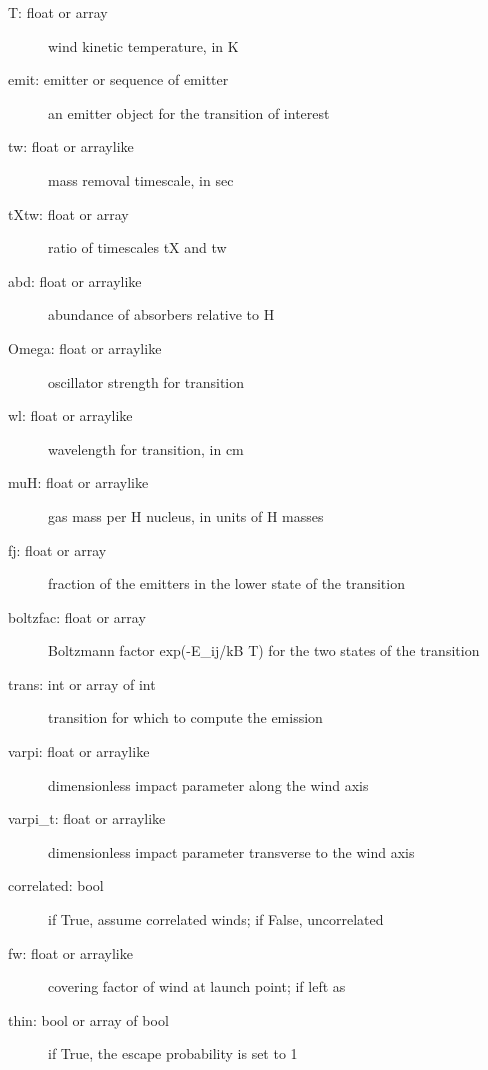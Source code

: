 \documentclass[letterpaper,10pt,english]{sphinxmanual}
\begin{document}
\begin{fulllineitems}
\begin{fulllineitems}
\begin{description}
\begin{description}
\item[{T: float or array}] \leavevmode
wind kinetic temperature, in K

\item[{emit: emitter or sequence of emitter}] \leavevmode
an emitter object for the transition of interest

\item[{tw: float or arraylike}] \leavevmode
mass removal timescale, in sec

\item[{tXtw: float or array}] \leavevmode
ratio of timescales tX and tw

\item[{abd: float or arraylike}] \leavevmode
abundance of absorbers relative to H

\item[{Omega: float or arraylike}] \leavevmode
oscillator strength for transition

\item[{wl: float or arraylike}] \leavevmode
wavelength for transition, in cm

\item[{muH: float or arraylike}] \leavevmode
gas mass per H nucleus, in units of H masses

\item[{fj: float or array}] \leavevmode
fraction of the emitters in the lower state of the
transition

\item[{boltzfac: float or array}] \leavevmode
Boltzmann factor exp(-E\_ij/kB T) for the two states of
the transition

\item[{trans: int or array of int}] \leavevmode
transition for which to compute the emission

\item[{varpi: float or arraylike}] \leavevmode
dimensionless impact parameter along the wind axis

\item[{varpi\_t: float or arraylike}] \leavevmode
dimensionless impact parameter transverse to the wind axis

\item[{correlated: bool}] \leavevmode
if True, assume correlated winds; if False, uncorrelated

\item[{fw: float or arraylike}] \leavevmode
covering factor of wind at launch point; if left as

\item[{thin: bool or array of bool}] \leavevmode
if True, the escape probability is set to 1


\end{description}
\end{description}
\end{fulllineitems}
\end{fulllineitems}
\end{document}
